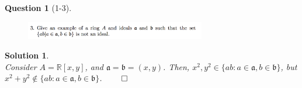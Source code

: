 \documentclass[11pt]{article}
\theoremstyle{plain}
\theoremstyle{quest}
\newtheorem*{question}{Question}
\newtheorem*{solution}{Solution}
\begin{document}
\newpage

\begin{question}[1-3]
\hfill
\begin{figure}[h!]
  \centering
    \includegraphics[width=0.7\textwidth]{ANT-s1-p3.png}
\end{figure}
\end{question}
\begin{solution} \hfill \\
Consider $A = \mathbb{R}[x,y]$, and $\mathfrak{a} = \mathfrak{b} = (x,y)$. 
Then, $x^2 , y^2 \in \{ab : a \in \mathfrak{a}, b \in \mathfrak{b}\}$, 
but $x^2 + y^2 \not\in \{ab : a \in \mathfrak{a}, b \in \mathfrak{b} \}$.  \hfill 
$\qed$ 
\end{solution}

\newpage
\end{document}
